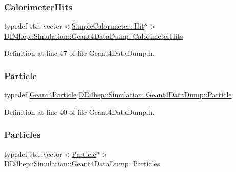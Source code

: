 \subsubsection{\texorpdfstring{Calorimeter\+Hits}{CalorimeterHits}}
{\footnotesize\ttfamily typedef std\+::vector$<$\hyperlink{class_d_d4hep_1_1_simulation_1_1_geant4_calorimeter_1_1_hit}{Simple\+Calorimeter\+::\+Hit}$\ast$$>$ \hyperlink{class_d_d4hep_1_1_simulation_1_1_geant4_data_dump_a405c85a9a72c4f1dc0164d4a61d98f75}{D\+D4hep\+::\+Simulation\+::\+Geant4\+Data\+Dump\+::\+Calorimeter\+Hits}}



Definition at line 47 of file Geant4\+Data\+Dump.\+h.

\hypertarget{class_d_d4hep_1_1_simulation_1_1_geant4_data_dump_a94c26fac6b79beaaed2c75c680b3f374}{}\label{class_d_d4hep_1_1_simulation_1_1_geant4_data_dump_a94c26fac6b79beaaed2c75c680b3f374} 
\subsubsection{\texorpdfstring{Particle}{Particle}}
{\footnotesize\ttfamily typedef \hyperlink{class_d_d4hep_1_1_simulation_1_1_geant4_particle}{Geant4\+Particle} \hyperlink{class_d_d4hep_1_1_simulation_1_1_geant4_data_dump_a94c26fac6b79beaaed2c75c680b3f374}{D\+D4hep\+::\+Simulation\+::\+Geant4\+Data\+Dump\+::\+Particle}}



Definition at line 40 of file Geant4\+Data\+Dump.\+h.

\hypertarget{class_d_d4hep_1_1_simulation_1_1_geant4_data_dump_a78b5910af0db1442a14600ae8dfc2a92}{}\label{class_d_d4hep_1_1_simulation_1_1_geant4_data_dump_a78b5910af0db1442a14600ae8dfc2a92} 
\subsubsection{\texorpdfstring{Particles}{Particles}}
{\footnotesize\ttfamily typedef std\+::vector$<$\hyperlink{class_d_d4hep_1_1_simulation_1_1_geant4_data_dump_a94c26fac6b79beaaed2c75c680b3f374}{Particle}$\ast$$>$ \hyperlink{class_d_d4hep_1_1_simulation_1_1_geant4_data_dump_a78b5910af0db1442a14600ae8dfc2a92}{D\+D4hep\+::\+Simulation\+::\+Geant4\+Data\+Dump\+::\+Particles}}



